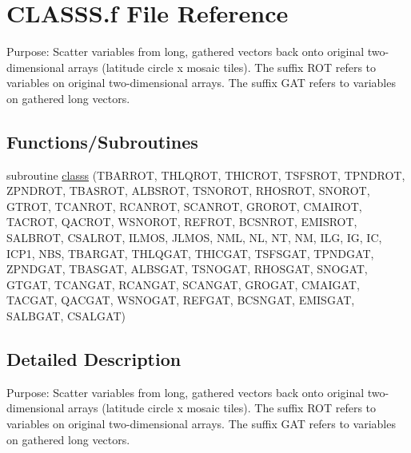 \hypertarget{CLASSS_8f}{}\section{C\+L\+A\+S\+S\+S.\+f File Reference}
\label{CLASSS_8f}


Purpose\+: Scatter variables from long, gathered vectors back onto original two-\/dimensional arrays (latitude circle x mosaic tiles). The suffix R\+O\+T refers to variables on original two-\/dimensional arrays. The suffix G\+A\+T refers to variables on gathered long vectors.  


\subsection*{Functions/\+Subroutines}
\begin{DoxyCompactItemize}
\item 
subroutine \hyperlink{CLASSS_8f_a3814fc276d21467a86f856186dd5d938}{classs} (T\+B\+A\+R\+R\+O\+T, T\+H\+L\+Q\+R\+O\+T, T\+H\+I\+C\+R\+O\+T, T\+S\+F\+S\+R\+O\+T, T\+P\+N\+D\+R\+O\+T, Z\+P\+N\+D\+R\+O\+T, T\+B\+A\+S\+R\+O\+T, A\+L\+B\+S\+R\+O\+T, T\+S\+N\+O\+R\+O\+T, R\+H\+O\+S\+R\+O\+T, S\+N\+O\+R\+O\+T, G\+T\+R\+O\+T, T\+C\+A\+N\+R\+O\+T, R\+C\+A\+N\+R\+O\+T, S\+C\+A\+N\+R\+O\+T, G\+R\+O\+R\+O\+T, C\+M\+A\+I\+R\+O\+T, T\+A\+C\+R\+O\+T, Q\+A\+C\+R\+O\+T, W\+S\+N\+O\+R\+O\+T, R\+E\+F\+R\+O\+T, B\+C\+S\+N\+R\+O\+T, E\+M\+I\+S\+R\+O\+T, S\+A\+L\+B\+R\+O\+T, C\+S\+A\+L\+R\+O\+T, I\+L\+M\+O\+S, J\+L\+M\+O\+S, N\+M\+L, N\+L, N\+T, N\+M, I\+L\+G, I\+G, I\+C, I\+C\+P1, N\+B\+S, T\+B\+A\+R\+G\+A\+T, T\+H\+L\+Q\+G\+A\+T, T\+H\+I\+C\+G\+A\+T, T\+S\+F\+S\+G\+A\+T, T\+P\+N\+D\+G\+A\+T, Z\+P\+N\+D\+G\+A\+T, T\+B\+A\+S\+G\+A\+T, A\+L\+B\+S\+G\+A\+T, T\+S\+N\+O\+G\+A\+T, R\+H\+O\+S\+G\+A\+T, S\+N\+O\+G\+A\+T, G\+T\+G\+A\+T, T\+C\+A\+N\+G\+A\+T, R\+C\+A\+N\+G\+A\+T, S\+C\+A\+N\+G\+A\+T, G\+R\+O\+G\+A\+T, C\+M\+A\+I\+G\+A\+T, T\+A\+C\+G\+A\+T, Q\+A\+C\+G\+A\+T, W\+S\+N\+O\+G\+A\+T, R\+E\+F\+G\+A\+T, B\+C\+S\+N\+G\+A\+T, E\+M\+I\+S\+G\+A\+T, S\+A\+L\+B\+G\+A\+T, C\+S\+A\+L\+G\+A\+T)
\end{DoxyCompactItemize}


\subsection{Detailed Description}
Purpose\+: Scatter variables from long, gathered vectors back onto original two-\/dimensional arrays (latitude circle x mosaic tiles). The suffix R\+O\+T refers to variables on original two-\/dimensional arrays. The suffix G\+A\+T refers to variables on gathered long vectors. 



